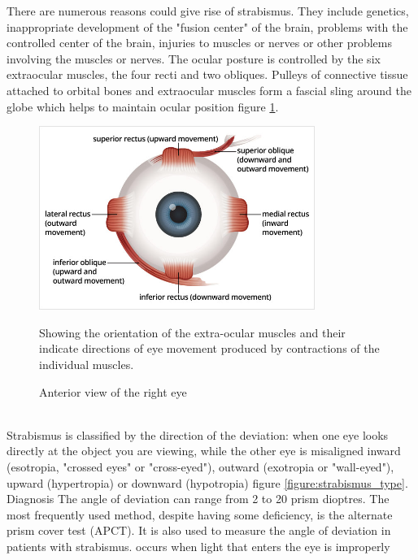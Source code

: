 \documentclass[12pt]{article}
\begin{document}
        There are numerous reasons could give rise of strabismus. They include genetics, inappropriate development of the "fusion center" of the brain, problems with the controlled center of the brain, injuries to muscles or nerves or other problems involving the muscles or nerves.
        The ocular posture is controlled by the six extraocular muscles, the four recti and two obliques. Pulleys of connective tissue attached to orbital bones and extraocular muscles form a fascial sling around the globe which helps to maintain ocular position figure \ref{fig:eye_muscles}.
        \begin{figure}[h]
            \centering
            \includegraphics[width = 0.8\textwidth]{Images/eye_muscles.png}
            \caption{Anterior view of the right eye}
            \label{fig:eye_muscles}
            \raggedright \footnotesize Showing the orientation of the extra-ocular muscles and their indicate directions of eye movement produced by contractions of the individual muscles.
        \end{figure}
        \\
        Strabismus is classified by the direction of the deviation: when one eye looks directly at the object you are viewing, while the other eye is misaligned inward (esotropia, "crossed eyes" or "cross-eyed"), outward (exotropia or "wall-eyed"), upward (hypertropia) or downward (hypotropia) figure \ref{figure:strabismus_type}.
        Diagnosis 
        The angle of deviation can range from 2 to 20 prism dioptres. The most frequently used method, despite having some deficiency, is the alternate prism cover test (APCT). It is also used to measure the angle of deviation in patients with strabismus.
        occurs when light that enters the eye is improperly
\end{document}
